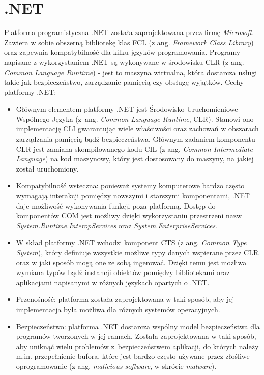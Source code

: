 \section{.NET}
Platforma programistyczna .NET została zaprojektowana przez firmę \textit{Microsoft}. Zawiera w sobie obszerną bibliotekę klas FCL (z ang. \textit{Framework Class Library}) oraz zapewnia kompatybilność dla kilku języków programowania. Programy napisane z wykorzystaniem .NET są wykonywane w środowisku CLR (z ang. \textit{Common Language Runtime}) - jest to maszyna wirtualna, która dostarcza usługi takie jak bezpieczeństwo, zarządzanie pamięcią czy obsługę wyjątków. Cechy platformy .NET:
\begin{itemize}
	\item Głównym elementem platformy .NET jest Środowisko Uruchomieniowe Wspólnego Języka (z~ang. \textit{Common Language Runtime}, CLR). Stanowi ono implementację CLI gwarantując wiele właściwości oraz zachowań w obszarach zarządzania pamięcią bądź bezpieczeństwa. Głównym zadaniem komponentu CLR jest zamiana skompilowanego kodu CIL (z ang. \textit{Common Intermediate Language}) na kod maszynowy, który jest dostosowany do maszyny, na jakiej został uruchomiony.
	\item Kompatybilność wsteczna: ponieważ systemy komputerowe bardzo często wymagają interakcji pomiędzy nowszymi i starszymi komponentami, .NET daje możliwość wykonywania funkcji poza platformą. Dostęp do komponentów COM jest możliwy dzięki wykorzystaniu przestrzeni nazw \textit{System.Runtime.InteropServices} oraz \textit{System.EnterpriseServices}.
	\item W skład platformy .NET wchodzi komponent CTS (z ang. \textit{Common Type System}), który definiuje wszystkie możliwe typy danych wspierane przez CLR oraz w jaki sposób mogą one ze sobą ingerować. Dzięki temu jest możliwa wymiana typów bądź instancji obiektów pomiędzy bibliotekami oraz aplikacjami napisanymi w różnych językach opartych o .NET.
	\item Przenośność: platforma została zaprojektowana w taki sposób, aby jej implementacja była możliwa dla różnych systemów operacyjnych.
	\item Bezpieczeństwo: platforma .NET dostarcza wspólny model bezpieczeństwa dla programów tworzonych w jej ramach. Została zaprojektowana w taki sposób, aby uniknąć wielu problemów z~bezpieczeństwem aplikacji, do których należy m.in. przepełnienie bufora, które jest bardzo często używane przez złośliwe oprogramowanie (z ang. \textit{malicious software}, w skrócie \textit{malware}).
	
\end{itemize}

